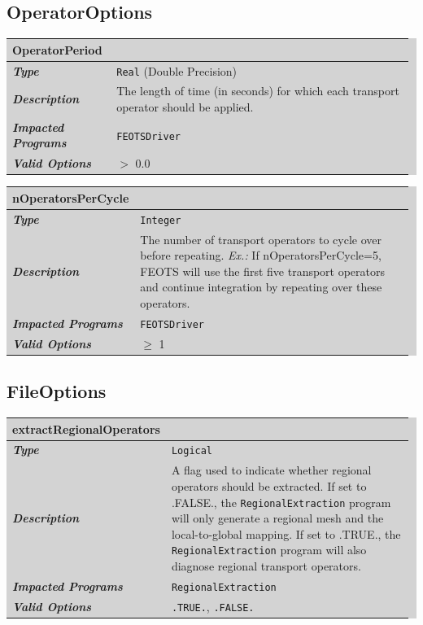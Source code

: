 \documentclass{softwaremanual}
\begin{document}
\subsection{OperatorOptions}
\noindent\begingroup\setlength{\fboxsep}{0pt}
\colorbox{lightgray}{
\begin{tabular}{p{0.25\linewidth} p{0.725\linewidth}}
\toprule
\textbf{OperatorPeriod} & \\
\midrule
\textbf{\textit{Type}} & \texttt{Real} (Double Precision) \\
\midrule
\textbf{\textit{Description}} & The length of time (in seconds) for which each transport operator should be applied. \\
\midrule
\textbf{\textit{Impacted Programs}} & \texttt{FEOTSDriver} \\
\midrule
\textbf{\textit{Valid Options}}  & $>$ 0.0 \\
\bottomrule
\end{tabular}
}\endgroup


\noindent\begingroup\setlength{\fboxsep}{0pt}
\colorbox{lightgray}{
\begin{tabular}{p{0.25\linewidth} p{0.725\linewidth}}
\toprule
\textbf{nOperatorsPerCycle} & \\
\midrule
\textbf{\textit{Type}} & \texttt{Integer} \\
\midrule
\textbf{\textit{Description}} & The number of transport operators to cycle over before repeating. \textit{Ex.:} If nOperatorsPerCycle=5, FEOTS will use the first five transport operators and continue integration by repeating over these operators. \\
\midrule
\textbf{\textit{Impacted Programs}} & \texttt{FEOTSDriver} \\
\midrule
\textbf{\textit{Valid Options}}  & $\geq$ 1 \\
\bottomrule
\end{tabular}
}\endgroup

\subsection{FileOptions}\label{sec:FileOptions}
\noindent\begingroup\setlength{\fboxsep}{0pt}
\colorbox{lightgray}{
\begin{tabular}{p{0.25\linewidth} p{0.725\linewidth}}
\toprule
\textbf{extractRegionalOperators} & \\
\midrule
\textbf{\textit{Type}} & \texttt{Logical} \\
\midrule
\textbf{\textit{Description}} & A flag used to indicate whether regional operators should be extracted. If set to .FALSE., the \texttt{RegionalExtraction} program will only generate a regional mesh and the local-to-global mapping. If set to .TRUE., the \texttt{RegionalExtraction} program will also diagnose regional transport operators. \\
\midrule
\textbf{\textit{Impacted Programs}} & \texttt{RegionalExtraction} \\
\midrule
\textbf{\textit{Valid Options}}  & \texttt{.TRUE.}, \texttt{.FALSE.} \\
\bottomrule
\end{tabular}
}\endgroup
\end{document}
